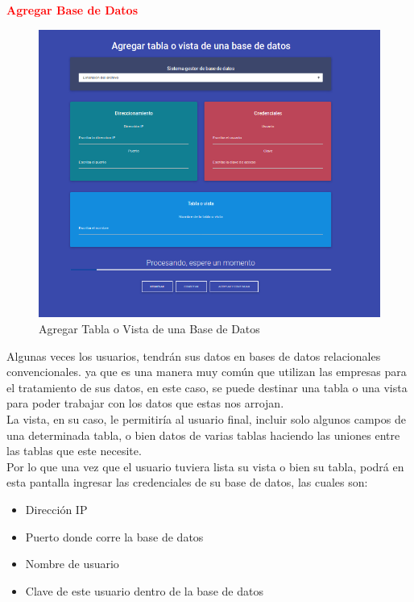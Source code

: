 \textbf{\textcolor{red}{Agregar Base de Datos}}
\begin{figure}[H]
	\hypertarget{fig:red}{\hspace{1pt}}
	\begin{center}
		\includegraphics[width=1\textwidth]{capitulo7/images/basededatos.png}
		\caption{Agregar Tabla o Vista de una Base de Datos}
		\label{fig:Tabla}
	\end{center}
\end{figure}
Algunas veces los usuarios, tendrán sus datos en bases de datos relacionales convencionales. ya que es una manera muy común que utilizan las empresas para el tratamiento de sus datos, en este caso, se puede destinar una tabla o una vista para poder trabajar con los datos que estas nos arrojan.\\
La vista, en su caso, le permitiría al usuario final, incluir solo algunos campos de una determinada tabla, o bien datos de varias tablas haciendo las uniones entre las tablas que este necesite. \\
Por lo que una vez que el usuario tuviera lista su vista o bien su tabla, podrá en esta pantalla ingresar las credenciales de su base de datos, las cuales son:
\begin{itemize}
	\item Dirección IP
	\item Puerto donde corre la base de datos
	\item Nombre de usuario
	\item Clave de este usuario dentro de la base de datos 
\end{itemize} 

